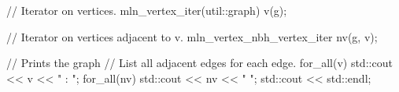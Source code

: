 // Iterator on vertices.
mln_vertex_iter(util::graph) v(g);

// Iterator on vertices adjacent to v.
mln_vertex_nbh_vertex_iter nv(g, v);

// Prints the graph
// List all adjacent edges for each edge.
for_all(v)
{
  std::cout << v << " : ";
  for_all(nv)
    std::cout << nv << " ";
  std::cout << std::endl;
}
